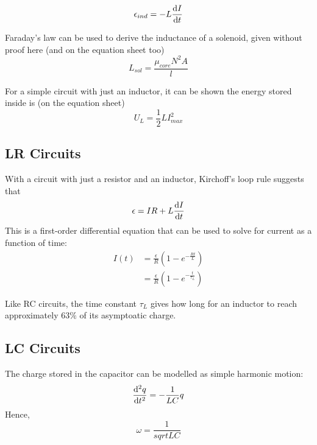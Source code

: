 \documentclass{article}
\begin{document}
\[\epsilon_{ind} = -L \odv{I}{t}\]

Faraday's law can be used to derive the inductance of a solenoid, given without proof here (and on the equation sheet too)
\[L_{sol} = \frac{\mu_{core} N^2 A}{l}\]

For a simple circuit with just an inductor, it can be shown the energy stored inside is (on the equation sheet)
\[U_L = \frac{1}{2} LI_{max}^2\]

\subsection{LR Circuits}
With a circuit with just a resistor and an inductor, Kirchoff's loop rule suggests that
\[\epsilon = IR + L \odv{I}{t}\]
This is a first-order differential equation that can be used to solve for current as a function of time:
\begin{align*}
    I(t) &= \frac{\epsilon}{R} (1 - e^{-\frac{Rt}{L}}) \\
    &= \frac{\epsilon}{R} (1 - e^{-\frac{t}{\tau_L}})
\end{align*}

Like RC circuits, the time constant $\tau_L$ gives how long for an inductor to reach approximately $63\%$ of its asymptoatic charge.

\subsection{LC Circuits}
The charge stored in the capacitor can be modelled as simple harmonic motion:
\[\odv[2]{q}{t} = -\frac{1}{LC} q\]
Hence,
\[\omega = \frac{1}{sqrt{LC}}\]
\end{document}
